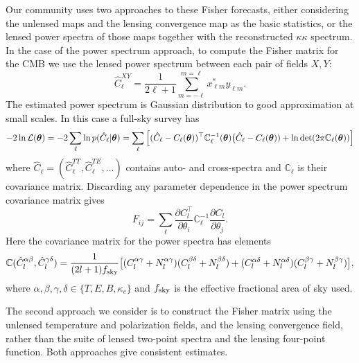 Our community uses two approaches to these Fisher forecasts, either considering the unlensed maps and the lensing convergence map as the basic statistics, or the lensed power spectra of those maps together with the reconstructed $\kappa \kappa$ spectrum. In the case of the power spectrum approach, to compute the Fisher matrix for the CMB we use the lensed power spectrum between each pair of fields $X, Y$:
%
\begin{equation}
\label{eqEstimator}
\hat{C}^{XY}_\ell = \frac{1}{2\ell+1}\sum_{m=-\ell}^{m=\ell} x^{*}_{\ell m} y_{\ell m}.
\end{equation}
%
The estimated power spectrum is Gaussian distribution to good approximation at small scales. In this case a full-sky survey has
%
\begin{equation}
-2\ln\mathcal{L}(\boldsymbol{\theta}) = -2\sum_\ell \ln p( \hat{C}_\ell | \boldsymbol{\theta}) \\
=  \sum_\ell  \Big[ (\hat{C}_\ell - C_\ell(\boldsymbol{\theta}) )^\top  \mathbb{C}^{-1}_\ell(\boldsymbol{\theta}) \big(\hat{C}_\ell - C_\ell(\boldsymbol{\theta})) + \ln \det(2 \pi \mathbb{C}_\ell(\boldsymbol{\theta})) \Big]
\end{equation}
%
where $ \hat{C}_\ell = (\hat{C}_\ell^{TT}, \hat{C}_\ell^{TE}, ...) $ contains auto- and cross-spectra and $\mathbb{C}_\ell$ is their covariance matrix. Discarding any parameter dependence in the power spectrum covariance matrix gives
%
\begin{equation}
F_{ij} = \sum_\ell \frac{\partial C^\top_l}{\partial \theta_i} \mathbb{C}^{-1}_\ell \frac{\partial C_l}{\partial \theta_j}.
\end{equation}
%
Here the covariance matrix for the power spectra has elements
%
\begin{equation}
\mathbb{C}(\hat{C}_l^{\alpha \beta}, \hat{C}_l^{\gamma \delta}) = \frac{1}{(2l+1)f_{\rm sky}} \big[ (C_l^{\alpha \gamma} + N_l^{\alpha \gamma}) (C_l^{\beta \delta} + N_l^{\beta \delta})  \\
+ (C_l^{\alpha \delta} + N_l^{\alpha \delta}) (C_l^{\beta \gamma} + N_l^{\beta \gamma}) \big],
\end{equation}
%
where $\alpha, \beta, \gamma, \delta \in \{T, E, B, \kappa_c\}$ and $f_{\rm sky}$ is the effective fractional area of sky used. 

The second approach we consider is to construct the Fisher matrix using the unlensed temperature and polarization fields, and the lensing convergence field, rather than the suite of lensed two-point spectra and the lensing four-point function. Both approaches give consistent estimates.

